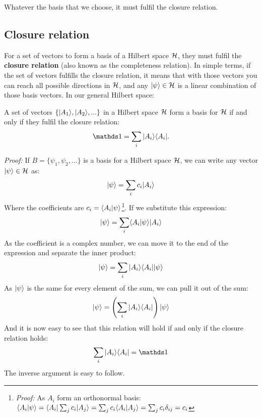 Whatever the basis that we choose, it must fulfil the closure relation.

\subsection{Closure relation}

For a set of vectors to form a basis of a Hilbert space $\mathcal{H}$, they must fulfil the \textbf{closure relation} (also known as the completeness relation). In simple terms, if the set of vectors fulfills the closure relation, it means that with those vectors you can reach all possible directions in $\mathcal{H}$, and any $|\psi\rangle\in\mathcal{H}$ is a linear combination of those basis vectors. In our general Hilbert space:

\begin{definition}
    A set of vectors $\{|A_1\rangle, |A_2\rangle, ...\}$ in a Hilbert space $\mathcal{H}$ form a basis for $\mathcal{H}$ if and only if they fulfil the closure relation:
    \begin{equation}
        \Imat = \sum_i\ket{A_i} \bra{A_i}.
    \end{equation}
\end{definition}

\textit{Proof:} If $B = \{\psi_1, \psi_2, ...\}$ is a basis for a Hilbert space $\mathcal{H}$, we can write any vector $|\psi\rangle\in\mathcal{H}$ as:
\begin{equation}
    |\psi\rangle = \sum_i c_i|A_i\rangle
\end{equation}
Where the coefficients are $c_i = \langle A_i|\psi\rangle$\footnote{\textit{Proof:} As $A_i$ form an orthonormal basis: $\langle A_i|\psi\rangle = \langle A_i|\sum_jc_i|A_j\rangle = \sum_jc_i\langle A_i|A_j\rangle = \sum_jc_i\delta_{ij} = c_i$}. If we substitute this expression:
\begin{equation}
    |\psi\rangle = \sum_i \langle A_i|\psi\rangle|A_i\rangle
\end{equation}
As the coefficient is a complex number, we can move it to the end of the expression and separate the inner product:
\begin{equation}
    |\psi\rangle = \sum_i |A_i\rangle\langle A_i||\psi\rangle
\end{equation}
As $|\psi\rangle$ is the same for every element of the sum, we can pull it out of the sum:
\begin{equation}
    |\psi\rangle = \left(\sum_i |A_i\rangle\langle A_i|\right)|\psi\rangle
\end{equation}
And it is now easy to see that this relation will hold if and only if the closure relation holds:
\begin{equation}
    \sum_i \ket{A_i}\bra{A_i} = \Imat
\end{equation}
The inverse argument is easy to follow.

